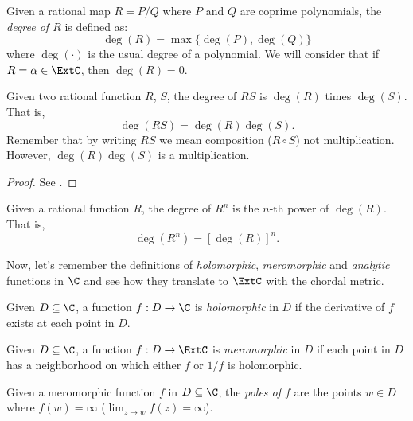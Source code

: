 \begin{definition}
    Given a rational map $R = P/Q$ where $P$ and $Q$ are coprime polynomials,
    the \emph{degree of $R$} is defined as:
    \[
        \deg(R) = \max \{ \deg(P), \deg(Q) \}
    \]
    where $\deg(\cdot)$ is the usual degree of a polynomial. We will consider
    that if $R = \alpha \in \ExtC$, then $\deg(R) = 0$.
\end{definition}

\begin{proposition}[{$\deg(RS) = \deg(R)\deg(S)$}]
    Given two rational function $R$, $S$, the degree of $RS$ is $\deg(R)$ times
    $\deg(S)$. That is,
    \[
        \deg(RS) = \deg(R)\deg(S).
    \]
    Remember that by writing $RS$ we mean composition ($R \circ S$) not
    multiplication. However, $\deg(R)\deg(S)$ is a multiplication.
\end{proposition}
\begin{proof}
    See \cite[32]{Beardon1991}.
\end{proof}

\begin{corollary}[{$\deg(R^n) = [\deg(R)]^n$}] Given a rational function $R$,
    the degree of $R^n$ is the $n$-th power of $\deg(R)$. That is,
    \[
        \deg(R^n) = [\deg(R)]^n.
    \]
\end{corollary}

Now, let's remember the definitions of \emph{holomorphic}, \emph{meromorphic}
and \emph{analytic} functions in $\C$ and see how they translate to $\ExtC$ with
the chordal metric.

\begin{definition}[Holomorphic]
    Given $D \subseteq \C$, a function $f : D \rightarrow \C$ is
    \emph{holomorphic} in $D$ if the derivative of $f$ exists at each point in
    $D$.
\end{definition}

\begin{definition}[Meromorphic]
    Given $D \subseteq \C$, a function $f : D \rightarrow \ExtC$ is
    \emph{meromorphic} in $D$ if each point in $D$ has a neighborhood on which
    either $f$ or $1/f$ is holomorphic.
\end{definition}

\begin{definition}[Pole of $f$]
    Given a meromorphic function $f$ in $D \subseteq \C$, the \emph{poles of
    $f$} are the points $w \in D$ where $f(w) = \infty$ ($\lim_{z \to w} f(z) =
    \infty$).
\end{definition}

